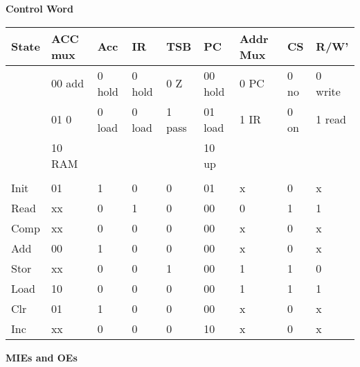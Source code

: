 \begin{enumerate}
\begin{onlysolution}
{                \textbf{ Control Word}

                \tiny{
                    \begin{tabular}{l|l|l|l|l|l|l|l|l}
                        State & ACC mux    & Acc   & IR    & TSB   & PC        & Addr Mux & CS    & R/W'    \\ \hline
                        & 00 add & 0 hold & 0 hold & 0 Z    & 00 hold & 0 PC    & 0 no & 0 write \\ \hline
                        & 01 0   & 0 load & 0 load & 1 pass & 01 load & 1 IR    & 0 on & 1 read \\ \hline
                        & 10 RAM &     &     &     & 10 up    &         &      &     \\ \hline
                        &     &     &     &     &     &          &      &     \\ \hline
                        Init  &    01    & 1    & 0    & 0    & 01    &    x    & 0    & x    \\ \hline
                        Read  & xx    & 0    & 1    & 0    & 00    &    0    & 1    & 1    \\ \hline
                        Comp  & xx    & 0    & 0    & 0    & 00    &    x    & 0    & x    \\ \hline
                        Add   & 00    & 1    & 0    & 0    & 00    &    x    & 0    & x    \\ \hline
                        Stor  & xx    & 0    & 0    & 1    & 00    &    1    & 1    & 0    \\ \hline
                        Load  & 10    & 0    & 0    & 0    & 00    &    1    & 1    & 1    \\ \hline
                        Clr   & 01    & 1    & 0    & 0    & 00    &    x    & 0    & x    \\ \hline
                        Inc   & xx    & 0    & 0    & 0    & 10    &    x    & 0    & x    \\
                    \end{tabular}
                }

                \textbf{ MIEs and OEs}

}
\end{onlysolution}
\end{enumerate}
